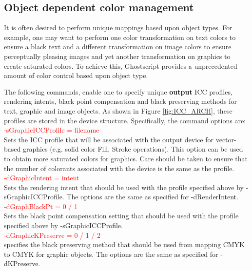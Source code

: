 \documentclass[12pt,notitlepage]{article}
\begin{document}
\subsection{Object dependent color management}

It is often desired to perform unique mappings based upon object types.  For example, one may want to perform one color transformation on text colors to ensure a black text and a different transformation on image colors to ensure perceptually pleasing images and yet another transformation on graphics to create saturated colors.   To achieve this, Ghostscript provides a unprecedented amount of color control based upon object type.

The following commands, enable one to specify unique {\bf output} ICC profiles, rendering intents, black point compensation and black preserving methods for text, graphic and image objects.  As shown in Figure \ref{fig:ICC_ARCH}, these profiles are stored in the device structure.  Specifically, the command options are:\\

\textcolor{red}{-sGraphicICCProfile = filename}\\

\noindent Sets the ICC profile that will be associated with the output device for vector-based graphics (e.g. solid color Fill, Stroke operations). This option can be used to obtain more saturated colors for graphics.  Care should be taken to ensure that the number of colorants associated with the device is the same as the profile. \\

\textcolor{red}{-dGraphicIntent = intent}\\

\noindent Sets the rendering intent that should be used with the profile specified above by -sGraphicICCProfile. The options are the same as specified for -dRenderIntent.\\

\textcolor{red}{-dGraphBlackPt = 0 / 1}\\

\noindent Sets the black point compensation setting that should be used with the profile specified above by -sGraphicICCProfile.\\

\textcolor{red}{-dGraphicKPreserve = 0 / 1 / 2}\\

\noindent specifies the black preserving method that should be used from mapping CMYK to CMYK for graphic objects.   The
options are the same as specified for -dKPreserve.\\
\end{document}
